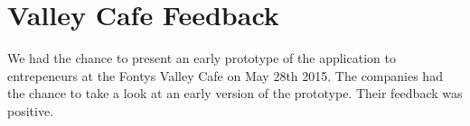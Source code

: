 \section{Valley Cafe Feedback}
We had the chance to present an early prototype of the application to entrepeneurs at the Fontys Valley Cafe on May 28th 2015.
The companies had the chance to take a look at an early version of the prototype. Their feedback was positive.
